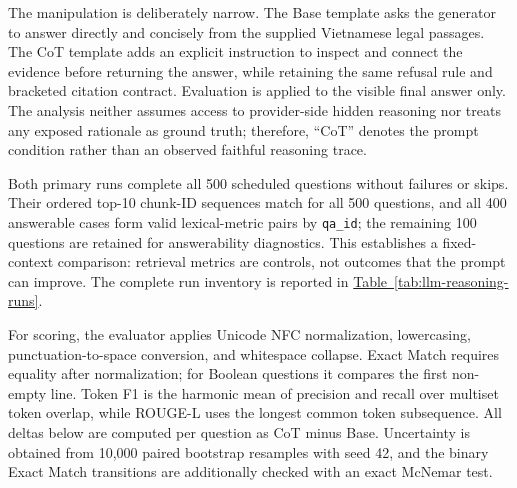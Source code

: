 The manipulation is deliberately narrow. The Base template asks the generator
to answer directly and concisely from the supplied Vietnamese legal passages.
The CoT template adds an explicit instruction to inspect and connect the
evidence before returning the answer, while retaining the same refusal rule
and bracketed citation contract. Evaluation is applied to the visible final
answer only. The analysis neither assumes access to provider-side hidden
reasoning nor treats any exposed rationale as ground truth; therefore, ``CoT''
denotes the prompt condition rather than an observed faithful reasoning trace.

Both primary runs complete all 500 scheduled questions without failures or
skips. Their ordered top-10 chunk-ID sequences match for all 500 questions,
and all 400 answerable cases form valid lexical-metric pairs by
\texttt{qa\_id}; the remaining 100 questions are retained for answerability
diagnostics. This establishes a fixed-context comparison: retrieval metrics
are controls, not outcomes that the prompt can improve. The complete run
inventory is reported in
\hyperref[tab:llm-reasoning-runs]{Table~\ref*{tab:llm-reasoning-runs}}.

For scoring, the evaluator applies Unicode NFC normalization, lowercasing,
punctuation-to-space conversion, and whitespace collapse. Exact Match requires
equality after normalization; for Boolean questions it compares the first
non-empty line. Token F1 is the harmonic mean of precision and recall over
multiset token overlap, while ROUGE-L uses the longest common token
subsequence. All deltas below are computed per question as CoT minus Base.
Uncertainty is obtained from 10,000 paired bootstrap resamples with seed 42,
and the binary Exact Match transitions are additionally checked with an exact
McNemar test.

